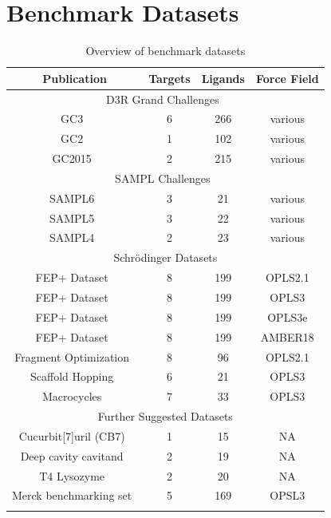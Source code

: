 \documentclass[9pt,bestpractices]{livecoms}
\begin{document}
\clearpage
\section{Benchmark Datasets}

\label{sec:benchmark}
\vspace{5mm}

\begin{table}
\caption{Overview of benchmark datasets}
\begin{tabular}{cccc}

\textbf{Publication} & \textbf{Targets} & \textbf{Ligands} & \textbf{Force Field} \\
\hline
\multicolumn{4}{|c|}{D3R Grand Challenges~\cite{D3R}} \\
\hline
GC3~\cite{gaieb2019d3r} & 6 & 266 & various \\
GC2~\cite{gaieb2018d3r} & 1 & 102 & various \\
GC2015~\cite{gathiaka2016d3r} & 2 & 215 & various \\
\hline
\multicolumn{4}{|c|}{SAMPL Challenges~\cite{SAMPL}} \\
\hline
SAMPL6~\cite{rizzi2018overview} & 3 & 21 & various \\
SAMPL5~\cite{yin2017overview} & 3 & 22 & various \\
SAMPL4~\cite{muddana2014sampl4} & 2 & 23 & various \\
\hline
\multicolumn{4}{|c|}{Schrödinger Datasets} \\
\hline
FEP+ Dataset~\cite{wang2015accurate} & 8 & 199 & OPLS2.1 \\
FEP+ Dataset~\cite{harder2016opls3} & 8 & 199 & OPLS3 \\
FEP+ Dataset~\cite{roos2019opls3e} & 8 & 199 & OPLS3e \\
FEP+ Dataset~\cite{song2019using} & 8 & 199 & AMBER18 \\
Fragment Optimization~\cite{steinbrecher2015accurate} & 8 & 96 & OPLS2.1 \\
Scaffold Hopping~\cite{wang2017accurate} & 6 & 21 & OPLS3 \\
Macrocycles~\cite{yu2017accurate} & 7 & 33 & OPLS3 \\
\hline
\multicolumn{4}{|c|}{Further Suggested Datasets} \\
\hline
Cucurbit[7]uril (CB7)~\cite{mobley2017predicting} & 1 & 15 & NA \\
Deep cavity cavitand~\cite{mobley2017predicting} & 2 & 19 & NA \\
T4 Lysozyme~\cite{mobley2017predicting} & 2 & 20 & NA \\
Merck benchmarking set~\cite{MCompChem2019Sep} & 5 & 169 & OPSL3 \\

\hline
\label{tab:benchmarks}
\end{tabular}
\end{table}
\end{document}
